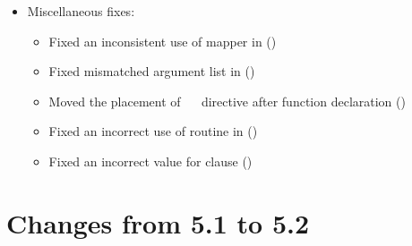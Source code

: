 \begin{itemize}
\item Miscellaneous fixes:
\begin{itemize}
\item Fixed an inconsistent use of mapper in 
  ()
\item Fixed mismatched argument list in 
  ()
\item Moved the placement of ~~
  directive after function declaration
  ()
\item Fixed an incorrect use of  routine in 
  ()
\item Fixed an incorrect value for  clause
  ()
\end{itemize}

\end{itemize}

\section{Changes from 5.1 to 5.2}
\label{sec:history_51_to_52}

